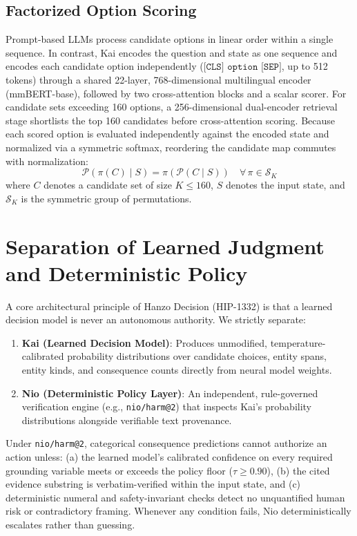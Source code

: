 \documentclass[11pt,a4paper]{article}
\begin{document}
\subsection{Factorized Option Scoring}

Prompt-based LLMs process candidate options in linear order within a single sequence. In contrast, Kai encodes the question and state as one sequence and encodes each candidate option independently ($\texttt{[CLS] option [SEP]}$, up to 512 tokens) through a shared 22-layer, 768-dimensional multilingual encoder (mmBERT-base), followed by two cross-attention blocks and a scalar scorer. For candidate sets exceeding 160 options, a 256-dimensional dual-encoder retrieval stage shortlists the top 160 candidates before cross-attention scoring. Because each scored option is evaluated independently against the encoded state and normalized via a symmetric softmax, reordering the candidate map commutes with normalization:
\begin{equation}
\mathcal{P}(\pi(C) \mid S) = \pi(\mathcal{P}(C \mid S)) \quad \forall \, \pi \in \mathcal{S}_K
\end{equation}
where $C$ denotes a candidate set of size $K \le 160$, $S$ denotes the input state, and $\mathcal{S}_K$ is the symmetric group of permutations.

\section{Separation of Learned Judgment and Deterministic Policy}

A core architectural principle of Hanzo Decision (HIP-1332) is that a learned decision model is never an autonomous authority. We strictly separate:
\begin{enumerate}
    \item \textbf{Kai (Learned Decision Model)}: Produces unmodified, temperature-calibrated probability distributions over candidate choices, entity spans, entity kinds, and consequence counts directly from neural model weights.
    \item \textbf{Nio (Deterministic Policy Layer)}: An independent, rule-governed verification engine (e.g., \texttt{nio/harm@2}) that inspects Kai's probability distributions alongside verifiable text provenance.
\end{enumerate}

Under \texttt{nio/harm@2}, categorical consequence predictions cannot authorize an action unless: (a) the learned model's calibrated confidence on every required grounding variable meets or exceeds the policy floor ($\tau \ge 0.90$), (b) the cited evidence substring is verbatim-verified within the input state, and (c) deterministic numeral and safety-invariant checks detect no unquantified human risk or contradictory framing. Whenever any condition fails, Nio deterministically escalates rather than guessing.
\end{document}
